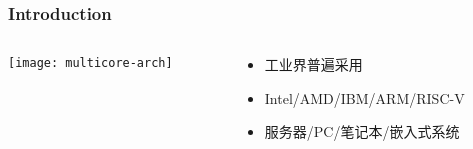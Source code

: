 %
%
\begin{frame}[plain]
	\frametitle{Introduction}
	
	
	
	\begin{columns}
		
		\begin{column}{.5\textwidth}
			\centering
			
			\texttt{[image: multicore-arch]}

		\end{column}
		
		\begin{column}{.5\textwidth}
			
			\Large

			\begin{itemize}
				\item 工业界普遍采用
				\item Intel/AMD/IBM/ARM/RISC-V
				\item 服务器/PC/笔记本/嵌入式系统
			
			\end{itemize}
			
		\end{column}
		
		
	\end{columns}
	
	
\end{frame}


